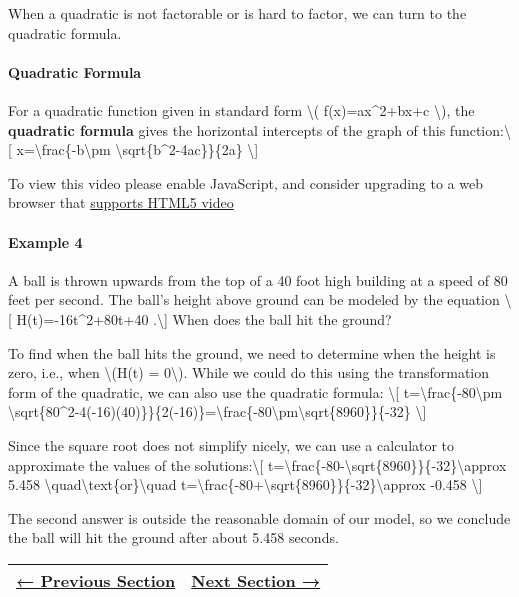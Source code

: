 When a quadratic is not factorable or is hard to factor, we can turn to
the quadratic formula.

\hypertarget{quadratic-formula}{%
\paragraph{Quadratic Formula}\label{quadratic-formula}}

For a quadratic function given in standard form \textbackslash{}(
f(x)=ax\^{}2+bx+c \textbackslash{}), the \textbf{quadratic formula}
gives the horizontal intercepts of the graph of this
function:\textbackslash{}{[}
x=\textbackslash{}frac\{-b\textbackslash{}pm
\textbackslash{}sqrt\{b\^{}2-4ac\}\}\{2a\} \textbackslash{}{]}

To view this video please enable JavaScript, and consider upgrading to a
web browser that \href{http://videojs.com/html5-video-support/}{supports
HTML5 video}

\hypertarget{example-4}{%
\paragraph{Example 4}\label{example-4}}

A ball is thrown upwards from the top of a 40 foot high building at a
speed of 80 feet per second. The ball's height above ground can be
modeled by the equation \textbackslash{}{[} H(t)=-16t\^{}2+80t+40
.\textbackslash{}{]} When does the ball hit the ground?

To find when the ball hits the ground, we need to determine when the
height is zero, i.e., when \textbackslash{}(H(t) = 0\textbackslash{}).
While we could do this using the transformation form of the quadratic,
we can also use the quadratic formula: \textbackslash{}{[}
t=\textbackslash{}frac\{-80\textbackslash{}pm
\textbackslash{}sqrt\{80\^{}2-4(-16)(40)\}\}\{2(-16)\}=\textbackslash{}frac\{-80\textbackslash{}pm\textbackslash{}sqrt\{8960\}\}\{-32\}
\textbackslash{}{]}

Since the square root does not simplify nicely, we can use a calculator
to approximate the values of the solutions:\textbackslash{}{[}
t=\textbackslash{}frac\{-80-\textbackslash{}sqrt\{8960\}\}\{-32\}\textbackslash{}approx
5.458 \textbackslash{}quad\textbackslash{}text\{or\}\textbackslash{}quad
t=\textbackslash{}frac\{-80+\textbackslash{}sqrt\{8960\}\}\{-32\}\textbackslash{}approx
-0.458 \textbackslash{}{]}

The second answer is outside the reasonable domain of our model, so we
conclude the ball will hit the ground after about 5.458 seconds.

\begin{longtable}[]{@{}ll@{}}
\toprule
\endhead
\href{section1-4.php}{← Previous Section} & \href{section1-6.php}{Next
Section →}\tabularnewline
\bottomrule
\end{longtable}
